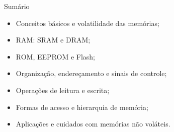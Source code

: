 \begin{frame}[t]{Sumário}
  \begin{itemize}
    \item Conceitos básicos e volatilidade das memórias;
    \item RAM: SRAM e DRAM;
    \item ROM, EEPROM e Flash;
    \item Organização, endereçamento e sinais de controle;
    \item Operações de leitura e escrita;
    \item Formas de acesso e hierarquia de memória;
    \item Aplicações e cuidados com memórias não voláteis.
  \end{itemize}
\end{frame}
